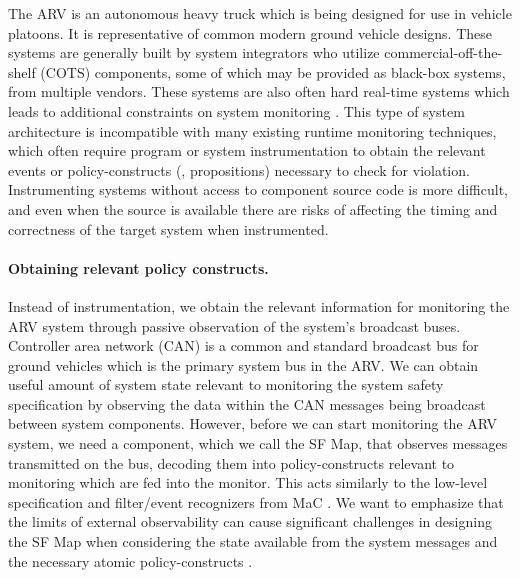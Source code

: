 The ARV is an autonomous heavy truck which is being designed for use in vehicle platoons. It is representative of common modern ground vehicle designs. These systems are generally built by system integrators who utilize commercial-off-the-shelf (COTS) components, some of which may be provided as black-box systems, from multiple vendors.
These systems are also often hard real-time systems which leads to additional constraints on system monitoring \cite{Goodloe2010}. 
This type of system architecture is incompatible with many existing runtime monitoring techniques, which often require program or system instrumentation \cite{Havelund2004, Chen2003, Bonakdarpour2012,Kim2004} to obtain the relevant events or policy-constructs (\eg, propositions) necessary to check for violation. 
Instrumenting systems without access to component source code is more difficult, and even when the source is available there are risks of affecting the timing and correctness of the target system when instrumented.

\paragraph{Obtaining relevant policy constructs.}
Instead of instrumentation, we obtain the relevant information for monitoring the ARV system through passive observation of the system's broadcast buses. %
Controller area network (CAN) is a common and standard broadcast bus for ground vehicles which is the primary system bus in the ARV. We can obtain useful amount of system state relevant to monitoring the system safety specification by observing the data within the CAN messages being broadcast between system components.
However, before we can start monitoring the ARV system, we need a component, which we call the \textsf{SF Map}, that observes messages transmitted on the bus, decoding them into policy-constructs relevant to monitoring which are fed into the monitor. 
This acts similarly to the low-level specification and filter/event recognizers from MaC \cite{Kim2004}.
We want to emphasize that the limits of external observability can cause significant challenges  in designing the \textsf{SF Map} when considering the state available from the system messages and the necessary atomic policy-constructs \cite{Kane2014}.

